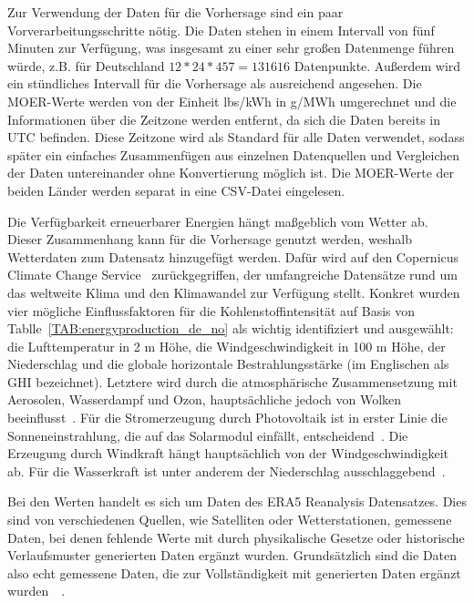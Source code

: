 Zur Verwendung der Daten für die Vorhersage sind ein paar Vorverarbeitungsschritte nötig.
Die Daten stehen in einem Intervall von fünf Minuten zur Verfügung, was insgesamt zu einer sehr großen Datenmenge führen würde, z.B. für Deutschland $12 * 24 * 457 = 131 616$ Datenpunkte.
Außerdem wird ein stündliches Intervall für die Vorhersage als ausreichend angesehen.
Die \ac{MOER}-Werte werden von der Einheit lbs/\ac{kWh} in g/MWh umgerechnet und die Informationen über die Zeitzone werden entfernt, da sich die Daten bereits in \ac{UTC} befinden.
Diese Zeitzone wird als Standard für alle Daten verwendet, sodass später ein einfaches Zusammenfügen aus einzelnen Datenquellen und Vergleichen der Daten untereinander ohne Konvertierung möglich ist.
Die \ac{MOER}-Werte der beiden Länder werden separat in eine CSV-Datei eingelesen.

Die Verfügbarkeit erneuerbarer Energien hängt maßgeblich vom Wetter ab.
Dieser Zusammenhang kann für die Vorhersage genutzt werden, weshalb Wetterdaten zum Datensatz hinzugefügt werden.
Dafür wird auf den Copernicus Climate Change Service~\cite{Copernicus.20231212T14:09:40.000Z} zurückgegriffen, der umfangreiche Datensätze rund um das weltweite Klima und den Klimawandel zur Verfügung stellt.
Konkret wurden vier mögliche Einflussfaktoren für die Kohlenstoffintensität auf Basis von Tablle~\ref{TAB:energyproduction_de_no} als wichtig identifiziert und ausgewählt:
die Lufttemperatur in 2 m Höhe, die Windgeschwindigkeit in 100 m Höhe, der Niederschlag und die globale horizontale Bestrahlungsstärke (im Englischen als \ac{GHI} bezeichnet).
Letztere wird durch die atmosphärische Zusammensetzung mit Aerosolen, Wasserdampf und Ozon, hauptsächliche jedoch von Wolken beeinflusst~\cite{KallioMyers.2020}.
Für die Stromerzeugung durch Photovoltaik ist in erster Linie die Sonneneinstrahlung, die auf das Solarmodul einfällt, entscheidend~\cite{James.}.
Die Erzeugung durch Windkraft hängt hauptsächlich von der Windgeschwindigkeit ab.
Für die Wasserkraft ist unter anderem der Niederschlag ausschlaggebend~\cite{Copernicus.20231212T14:09:40.000Z}.

Bei den Werten handelt es sich um Daten des ERA5 Reanalysis Datensatzes.
Dies sind von verschiedenen Quellen, wie Satelliten oder Wetterstationen, gemessene Daten, bei denen fehlende Werte mit durch physikalische Gesetze oder historische Verlaufsmuster generierten Daten ergänzt wurden.
Grundsätzlich sind die Daten also echt gemessene Daten, die zur Vollständigkeit mit generierten Daten ergänzt wurden~\cite{CopernicusClimateChangeService.2020}~\cite{CopernicusKnowledgeBase.20231009}.

